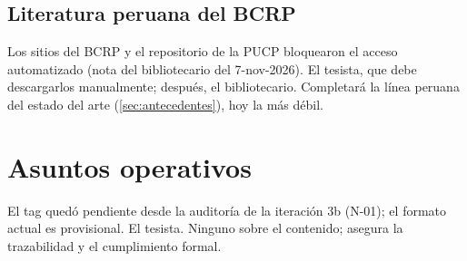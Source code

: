 \subsection{Literatura peruana del BCRP}
\label{sec:pend-bcrp}

{Los sitios del BCRP y el repositorio de la PUCP bloquearon el acceso automatizado (nota del
bibliotecario del 7-nov-2026).}
{El tesista, que debe descargarlos manualmente; después, el bibliotecario.}
{Completará la línea peruana del estado del arte (\cref{sec:antecedentes}), hoy la más débil.}

\section{Asuntos operativos}
\label{sec:pend-operativos}

{El tag quedó pendiente desde la auditoría de la iteración 3b (N-01); el formato actual es
provisional.}
{El tesista.}
{Ninguno sobre el contenido; asegura la trazabilidad y el cumplimiento formal.}

